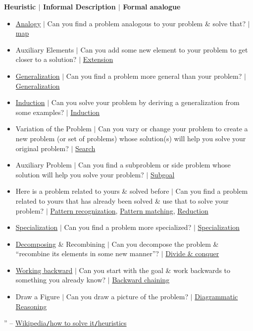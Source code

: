 \documentclass[oneside]{book}
\numberwithin{equation}{section}
\begin{document}
\textbf{Heuristic $|$ Informal Description $|$ Formal analogue}
\begin{itemize}
	\item \href{https://en.wikipedia.org/wiki/Analogy}{Analogy} $|$ Can you find a problem analogous to your problem \& solve that? $|$ \href{https://en.wikipedia.org/wiki/Map_(mathematics)}{map}
	\item Auxiliary Elements $|$ Can you add some new element to your problem to get closer to a solution? $|$ \href{https://en.wikipedia.org/wiki/Extension_(predicate_logic)}{Extension}
	\item \href{https://en.wikipedia.org/wiki/Generalization}{Generalization} $|$ Can you find a problem more general than your problem? $|$ \href{https://en.wikipedia.org/wiki/Generalization}{Generalization}
	\item \href{https://en.wikipedia.org/wiki/Induction_(philosophy)}{Induction} $|$ Can you solve your problem by deriving a generalization from some examples? $|$ \href{https://en.wikipedia.org/wiki/Induction_(philosophy)}{Induction}
	\item Variation of the Problem $|$ Can you vary or change your problem to create a new problem (or set of problems) whose solution(s) will help you solve your original problem? $|$ \href{https://en.wikipedia.org/wiki/Search_algorithm}{Search}
	\item Auxiliary Problem $|$ Can you find a subproblem or side problem whose solution will help you solve your problem? $|$ \href{https://en.wikipedia.org/wiki/Subgoal}{Subgoal}
	\item Here is a problem related to yours \& solved before $|$ Can you find a problem related to yours that has already been solved \& use that to solve your problem? $|$ \href{https://en.wikipedia.org/wiki/Pattern_recognition}{Pattern recognization}, \href{https://en.wikipedia.org/wiki/Pattern_matching}{Pattern matching}, \href{https://en.wikipedia.org/wiki/Reduction_(complexity)}{Reduction}
	\item \href{https://en.wikipedia.org/wiki/Special_case}{Specialization} $|$ Can you find a problem more specialized? $|$ \href{https://en.wikipedia.org/wiki/Special_case}{Specialization}
	\item \href{https://en.wikipedia.org/wiki/Decomposition_(computer_science)}{Decomposing} \& Recombining $|$ Can you decompose the problem \& ``recombine its elements in some new manner''? $|$ \href{https://en.wikipedia.org/wiki/Divide_and_conquer_algorithm}{Divide \& conquer}
	\item \href{https://en.wikipedia.org/wiki/Working_backward_from_the_goal}{Working backward} $|$ Can you start with the goal \& work backwards to something you already know? $|$ \href{https://en.wikipedia.org/wiki/Backward_chaining}{Backward chaining}
	\item Draw a Figure $|$ Can you draw a picture of the problem? $|$ \href{https://en.wikipedia.org/wiki/Diagrammatic_Reasoning}{Diagrammatic Reasoning}
\end{itemize}
'' -- \href{https://en.wikipedia.org/wiki/How_to_Solve_It#Heuristics}{Wikipedia\texttt{/}how to solve it\texttt{/}heuristics}
\end{document}
